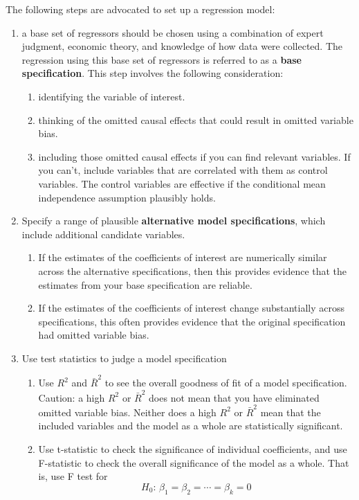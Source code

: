 \documentclass[a4paper,11pt]{article}
\begin{document}
The following steps are advocated to set up a regression model:
\begin{enumerate}
\item a  base set of regressors should be chosen using a
combination of expert judgment, economic theory, and knowledge of
how data were collected. The regression using this base set of
regressors is referred to as a \textbf{base specification}. This step
involves the following consideration:
\begin{enumerate}
\item identifying the variable of interest.
\item thinking of the omitted causal effects that could result in omitted
variable bias.
\item including those omitted causal effects if you can find relevant
variables. If you can’t, include variables that are correlated
with them as control variables. The control variables are
effective if the conditional mean independence assumption
plausibly holds.
\end{enumerate}
\item Specify a range of plausible \textbf{alternative model specifications},
which include additional candidate variables.
\begin{enumerate}
\item If the estimates of the coefficients of interest are numerically
similar across the alternative specifications, then this
provides evidence that the estimates from your base
specification are reliable.
\item If the estimates of the coefficients of interest change
substantially across specifications, this often provides
evidence that the original specification had omitted variable
bias.
\end{enumerate}
\item Use test statistics to judge a model specification
\begin{enumerate}
\item Use \(R^2\) and \(\bar{R}^2\) to see the overall goodness of fit of
a model specification. Caution: a high \(R^2\) or \(\bar{R}^2\) does
not mean that you have eliminated omitted variable bias. Neither
does a high \(R^2\) or \(\bar{R}^2\) mean that the included
variables and the model as a whole are statistically
significant.
\item Use t-statistic to check the significance of individual
coefficients, and use F-statistic to check the overall
significance of the model as a whole. That is, use F test for
\[H_0:\, \beta_1 = \beta_2 = \cdots = \beta_k = 0 \]
\end{enumerate}
\end{enumerate}
\end{document}

